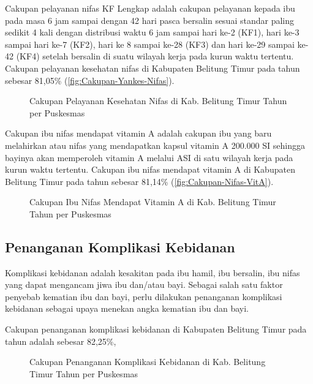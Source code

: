 Cakupan pelayanan nifas KF Lengkap adalah cakupan pelayanan kepada ibu pada masa 6 jam sampai dengan 42 hari pasca bersalin sesuai standar paling sedikit 4 kali dengan distribusi waktu 6 jam sampai hari ke-2 (KF1), hari ke-3 sampai hari ke-7 (KF2), hari ke 8 sampai ke-28 (KF3) dan hari ke-29 sampai ke-42 (KF4) setelah bersalin di suatu wilayah kerja pada kurun waktu tertentu. Cakupan pelayanan kesehatan nifas di Kabupaten Belitung Timur pada tahun \tP sebesar 81,05\% (\autoref{fig:Cakupan-Yankes-Nifas}).%

\begin{figure}[H]
    \centering{}
    \caption{Cakupan Pelayanan Kesehatan Nifas di Kab. Belitung Timur Tahun \tP per Puskesmas}
    \label{fig:Cakupan-Yankes-Nifas}
\end{figure}

Cakupan ibu nifas mendapat vitamin A adalah cakupan ibu yang baru melahirkan atau nifas yang mendapatkan kapsul vitamin A 200.000 SI sehingga bayinya akan memperoleh vitamin A melalui ASI di satu wilayah kerja pada kurun waktu tertentu.
Cakupan ibu nifas mendapat vitamin A di Kabupaten Belitung Timur pada tahun \tP sebesar 81,14\% (\autoref{fig:Cakupan-Nifas-VitA}).

\begin{figure}[H]
    \centering{}
    \caption{Cakupan Ibu Nifas Mendapat Vitamin A di Kab. Belitung Timur Tahun \tP per Puskesmas}
    \label{fig:Cakupan-Nifas-VitA}
\end{figure}

\subsection{Penanganan Komplikasi Kebidanan}
Komplikasi kebidanan adalah kesakitan pada ibu hamil, ibu bersalin, ibu nifas yang dapat mengancam jiwa ibu dan/atau bayi. Sebagai salah satu faktor penyebab kematian ibu dan bayi, perlu dilakukan penanganan komplikasi kebidanan sebagai upaya menekan angka kematian ibu dan bayi.

Cakupan penanganan komplikasi kebidanan di Kabupaten Belitung Timur pada tahun \tP adalah sebesar 82,25\%,

\begin{figure}[H]
    \centering
    \caption{Cakupan Penanganan Komplikasi Kebidanan di Kab. Belitung Timur Tahun \tP per Puskesmas}
    \label{fig:Cakupan-Komplikasi-Kebidanan}
\end{figure}


